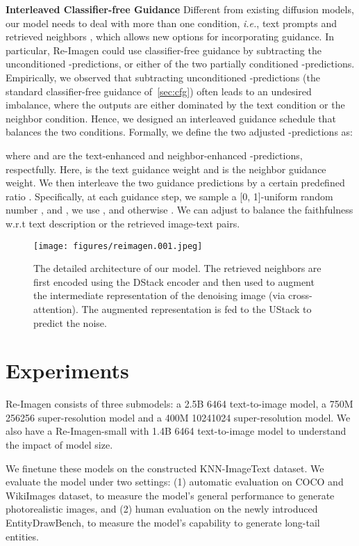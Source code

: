 \documentclass{article} \usepackage{iclr2023_conference,times}
\newcommand{\ie}{\textit{i.e.}}
\newcommand{\modelname}{{Re-Imagen}\xspace}
\begin{document}
\noindent \textbf{Interleaved Classifier-free Guidance}
\label{sec:interleaved}
Different from existing diffusion models, our model needs to deal with more than one condition, \ie, text prompts  and retrieved neighbors , which allows new options for incorporating guidance. In particular, \modelname could use classifier-free guidance by subtracting the unconditioned -predictions, or either of the two partially conditioned -predictions. Empirically, we observed that subtracting unconditioned -predictions (the standard classifier-free guidance of~\autoref{sec:cfg}) often leads to an undesired imbalance, where the outputs are either dominated by the text condition or the neighbor condition. Hence, we designed an interleaved guidance schedule that balances the two conditions. Formally, we define the two adjusted -predictions as:

where  and  are the text-enhanced and neighbor-enhanced -predictions, respectfully. Here,  is the text guidance weight and  is the neighbor guidance weight. We then interleave the two guidance predictions by a certain predefined ratio .  Specifically, at each guidance step, we sample a [0, 1]-uniform random number , and , we use , and otherwise . We can adjust  to balance the faithfulness w.r.t text description or the retrieved image-text pairs. 
\begin{figure}[!t]
    \centering
    \texttt{[image: figures/reimagen.001.jpeg]}
    \caption{The detailed architecture of our model. The retrieved neighbors are first encoded using the DStack encoder and then used to augment the intermediate representation of the denoising image (via cross-attention). The augmented representation is fed to the UStack to predict the noise.}
    \label{fig:detail}
\end{figure}


\section{Experiments}
\modelname consists of three submodels: a 2.5B 6464 text-to-image model, a 750M 256256 super-resolution model and a 400M 10241024 super-resolution model. We also have a \modelname-small with 1.4B 6464 text-to-image model to understand the impact of model size.

We finetune these models on the constructed KNN-ImageText dataset. We evaluate the model under two settings: (1) automatic evaluation on COCO and WikiImages dataset, to measure the model's general performance to generate photorealistic images, and (2) human evaluation on the newly introduced EntityDrawBench, to measure the model's capability to generate long-tail entities.
\end{document}
